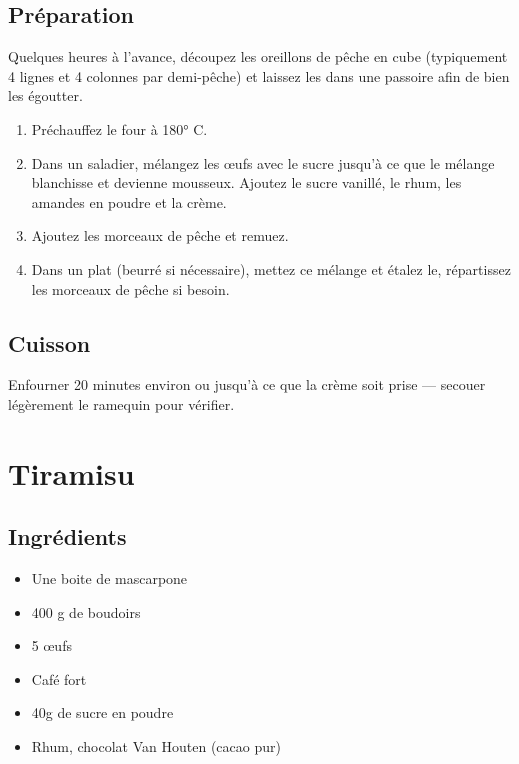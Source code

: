\subsection*{Préparation}
Quelques heures à l'avance, découpez les oreillons de pêche en cube (typiquement 4 lignes et 4 colonnes par demi-pêche) et laissez les dans une passoire afin de bien les égoutter.

\begin{enumerate}
\item Préchauffez le four à 180° C.
\item Dans un saladier, mélangez les œufs avec le sucre jusqu'à ce que le mélange blanchisse et devienne mousseux. Ajoutez le sucre vanillé, le rhum, les amandes en poudre et la crème. 
\item Ajoutez les morceaux de pêche et remuez.
\item Dans un plat (beurré si nécessaire), mettez ce mélange et étalez le, répartissez les morceaux de pêche si besoin.
\end{enumerate}

\subsection*{Cuisson}
Enfourner 20 minutes environ ou jusqu'à ce que la crème soit prise --- secouer légèrement le ramequin pour vérifier.


\newpage
\section{Tiramisu}
\subsection*{Ingrédients}
\begin{itemize}
\item Une boite de mascarpone
\item 400 g de boudoirs
\item 5 œufs
\item Café fort
\item 40g de sucre en poudre
\item Rhum, chocolat Van Houten (cacao pur)
\end{itemize}

